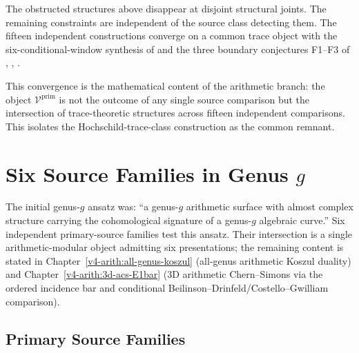 \begin{theorem}
\label{v4-arith:app:B:thm:obstruction-theoretic-convergence}
The obstructed structures above disappear at disjoint structural
joints. The remaining constraints are independent of the source class
detecting them. The fifteen independent constructions converge on a
common trace object with the six-conditional-window synthesis of
 and the three boundary
conjectures F1--F3 of ,
, .
\end{theorem}

This convergence is the mathematical content of the arithmetic
branch: the object $\mathcal{V}^{\mathrm{prim}}$ is not the
outcome of any single source comparison but the intersection of
trace-theoretic structures across fifteen independent comparisons.
This isolates the Hochschild-trace-class construction as the common
remnant.

\section{Six Source Families in Genus \(g\)}
\label{v4-arith:app:B:genus-g-session}

The initial genus-\(g\) ansatz was: ``a genus-$g$ arithmetic surface
with almost complex structure carrying the cohomological signature of a
genus-$g$ algebraic curve.'' Six independent primary-source families
test this ansatz. Their intersection is a single arithmetic-modular
object admitting six presentations; the remaining content is stated in
Chapter~\ref{v4-arith:all-genus-koszul} (all-genus arithmetic Koszul
duality) and Chapter~\ref{v4-arith:3d-acs-E1bar} (3D arithmetic
Chern--Simons via the ordered incidence bar and conditional
Beilinson--Drinfeld/Costello--Gwilliam comparison).

\subsection{Primary Source Families}
\label{v4-arith:app:B:genus-g:six-sources}

